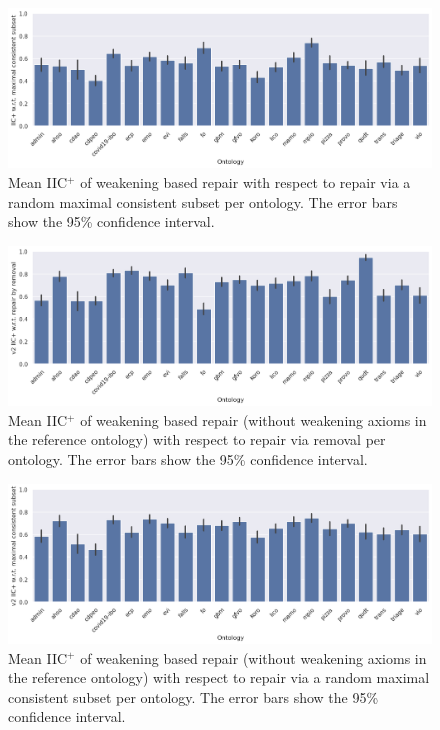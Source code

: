 \begin{figure}[htbp]
  \centering
  \includegraphics[width=\textwidth]{resources/eiic-mcs-ontology-bar.png}
  \caption{Mean IIC$^+$ of weakening based repair with respect to repair via a random maximal consistent subset per ontology. The error bars show the 95\% confidence interval.}
\end{figure}

\begin{figure}[htbp]
  \centering
  \includegraphics[width=\textwidth]{resources/eiic-enhance-rem-ontology-bar.png}
  \caption{Mean IIC$^+$ of weakening based repair (without weakening axioms in the reference ontology) with respect to repair via removal per ontology. The error bars show the 95\% confidence interval.}
\end{figure}

\begin{figure}[htbp]
  \centering
  \includegraphics[width=\textwidth]{resources/eiic-enhance-ontology-bar.png}
  \caption{Mean IIC$^+$ of weakening based repair (without weakening axioms in the reference ontology) with respect to repair via a random maximal consistent subset per ontology. The error bars show the 95\% confidence interval.}
\end{figure}

